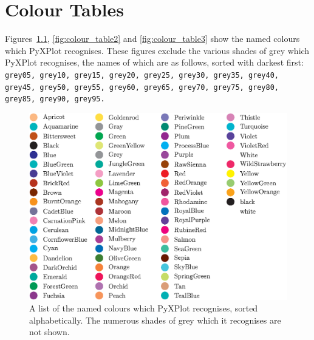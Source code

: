 %
%
%
%
%



\chapter{Colour Tables}
\label{colour_charts}

 Figures~\ref{fig:colour_table1}, \ref{fig:colour_table2}
and \ref{fig:colour_table3} show the named colours which PyXPlot recognises.
These figures exclude the various shades of grey which PyXPlot recognises, the
names of which are as follows, sorted with darkest first:
{\tt grey05, grey10, grey15, grey20, grey25, grey30, grey35, grey40, grey45, grey50, grey55, grey60, grey65, grey70, grey75, grey80, grey85, grey90, grey95.}

\begin{figure}
\begin{center}
\includegraphics[width=\textwidth]{figures/pyx_colours2.eps}
\end{center}
\caption{A list of the named colours which PyXPlot recognises, sorted alphabetically. The numerous shades of grey which it recognises are not shown.}
\label{fig:colour_table1}
\end{figure}

